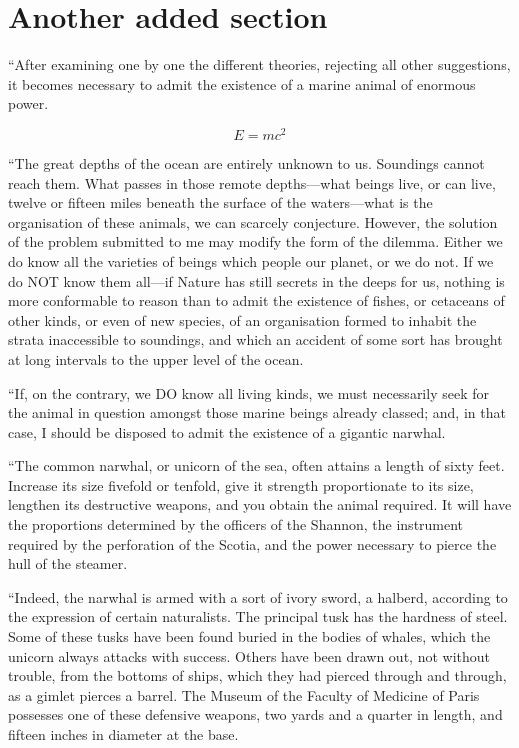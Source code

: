 \section{Another added section}

``After examining one by one the different theories, rejecting all
other suggestions, it becomes necessary to admit the existence
of a marine animal of enormous power.

\begin{equation}
E=mc^2
\end{equation}

``The great depths of the ocean are entirely unknown to us.
Soundings cannot reach them.  What passes in those remote depths---what 
beings live, or can live, twelve or fifteen miles beneath
the surface of the waters---what is the organisation of these animals,
we can scarcely conjecture.  However, the solution of the problem
submitted to me may modify the form of the dilemma.  Either we do know
all the varieties of beings which people our planet, or we do not.
If we do NOT know them all---if Nature has still secrets in the deeps
for us, nothing is more conformable to reason than to admit the existence
of fishes, or cetaceans of other kinds, or even of new species,
of an organisation formed to inhabit the strata inaccessible to soundings,
and which an accident of some sort has brought at long intervals
to the upper level of the ocean.

``If, on the contrary, we DO know all living kinds, we must
necessarily seek for the animal in question amongst those marine
beings already classed; and, in that case, I should be disposed
to admit the existence of a gigantic narwhal.

``The common narwhal, or unicorn of the sea, often attains
a length of sixty feet.  Increase its size fivefold or tenfold,
give it strength proportionate to its size, lengthen its
destructive weapons, and you obtain the animal required.
It will have the proportions determined by the officers
of the Shannon, the instrument required by the perforation
of the Scotia, and the power necessary to pierce the hull
of the steamer.\cite{inproceedings-full}

``Indeed, the narwhal is armed with a sort of ivory sword,
a halberd, according to the expression of certain naturalists.
The principal tusk has the hardness of steel.  Some of these tusks
have been found buried in the bodies of whales, which the unicorn
always attacks with success.  Others have been drawn out,
not without trouble, from the bottoms of ships, which they
had pierced through and through, as a gimlet pierces a barrel.
The Museum of the Faculty of Medicine of Paris possesses one
of these defensive weapons, two yards and a quarter in length,
and fifteen inches in diameter at the base.

